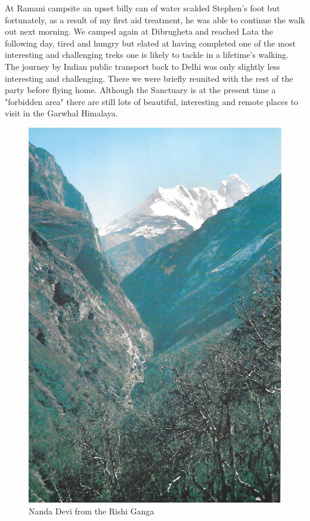\documentclass[a5paper,openany,font 10pt]{scrbook}
\begin{document}
At Ramani campsite an upset billy can of water scalded
Stephen's foot but fortunately, as a result of my first aid
treatment, he was able to continue the walk out next morning.
We camped again at Dibrugheta and reached Lata the following
day, tired and hungry but elated at having completed one of the
most interesting and challenging treks one is likely to tackle in
a lifetime's walking.    The journey by Indian public transport back to Delhi was
only slightly less interesting and challenging. There we were
briefly reunited with the rest of the party before flying home.
Although the Sanctuary is at the present time a "forbidden area"
there are still lots of beautiful, interesting and remote places
to visit in the Garwhal Himalaya.
\begin{figure}[htb]
\centering
\includegraphics[width=.9\linewidth]{./images/Nanda_Devi_from_Rishi_Ganga.jpg}
\caption{\label{fig:orga300e61}
Nanda Devi from the Rishi Ganga}
\end{figure}
\end{document}
